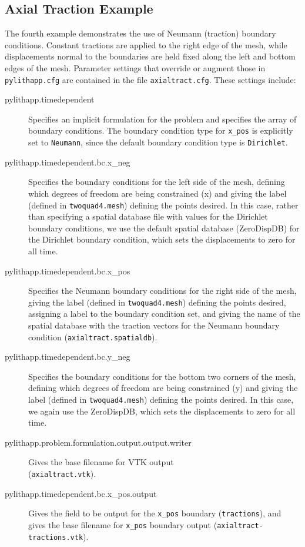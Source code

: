 \subsection{\label{sec:examples:twoquad4-traction}Axial Traction Example}

The fourth example demonstrates the use of Neumann (traction) boundary
conditions. Constant tractions are applied to the right edge of the
mesh, while displacements normal to the boundaries are held fixed
along the left and bottom edges of the mesh. Parameter settings that
override or augment those in \texttt{pylithapp.cfg} are contained
in the file \texttt{axialtract.cfg}. These settings include:
\begin{description}
\item [{pylithapp.timedependent}] Specifies an implicit formulation for
the problem and specifies the array of boundary conditions. The boundary
condition type for \texttt{x\_pos} is explicitly set to \texttt{Neumann},
since the default boundary condition type is \texttt{Dirichlet}.
\item [{pylithapp.timedependent.bc.x\_neg}] Specifies the boundary conditions
for the left side of the mesh, defining which degrees of freedom are
being constrained (x) and giving the label (defined in \texttt{twoquad4.mesh})
defining the points desired. In this case, rather than specifying
a spatial database file with values for the Dirichlet boundary conditions,
we use the default spatial database (ZeroDispDB) for the Dirichlet
boundary condition, which sets the displacements to zero for all time.
\item [{pylithapp.timedependent.bc.x\_pos}] Specifies the Neumann boundary
conditions for the right side of the mesh, giving the label (defined
in \texttt{twoquad4.mesh}) defining the points desired, assigning
a label to the boundary condition set, and giving the name of the
spatial database with the traction vectors for the Neumann boundary
condition (\texttt{axialtract.spatialdb}).
\item [{pylithapp.timedependent.bc.y\_neg}] Specifies the boundary conditions
for the bottom two corners of the mesh, defining which degrees of
freedom are being constrained (y) and giving the label (defined in
\texttt{twoquad4.mesh}) defining the points desired. In this case,
we again use the ZeroDispDB, which sets the displacements to zero
for all time.
\item [{pylithapp.problem.formulation.output.output.writer}] Gives the
base filename for VTK output \\
(\texttt{axialtract.vtk}).
\item [{pylithapp.timedependent.bc.x\_pos.output}] Gives the field to be
output for the \texttt{x\_pos} boundary (\texttt{tractions}), and
gives the base filename for \texttt{x\_pos} boundary output (\texttt{axialtract-tractions.vtk}).
\end{description}
